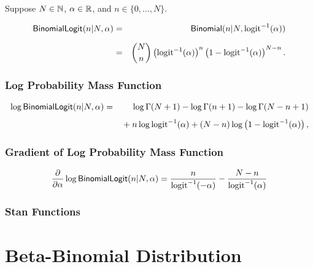 Suppose $N \in \mathbb{N}$, $\alpha \in \mathbb{R}$, and $n \in
\{0,\ldots,N\}$.

\begin{eqnarray*}
\mbox{\sf BinomialLogit}(n|N,\alpha)
& = & \mbox{\sf Binomial}(n|N,\mbox{logit}^{-1}(\alpha))
\\[6pt]
& = & \binom{N}{n} \left( \mbox{logit}^{-1}(\alpha) \right)^{n}
                    \left( 1 - \mbox{logit}^{-1}(\alpha) \right)^{N - n}.
\end{eqnarray*}


\subsubsection{Log Probability Mass Function}

\begin{eqnarray*}
\log \mbox{\sf BinomialLogit}(n|N,\alpha)
& = &
\log \Gamma(N+1) - \log \Gamma(n + 1) - \log \Gamma(N- n + 1)
\\[4pt]
& & { } + n \log \mbox{logit}^{-1}(\alpha) + (N - n) \log \left( 1 -
  \mbox{logit}^{-1}(\alpha) \right),
\end{eqnarray*}


\subsubsection{Gradient of Log Probability Mass Function}

\[
\frac{\partial}{\partial \alpha} \log \mbox{\sf BinomialLogit}(n|N,\alpha)
= \frac{n}{\mbox{logit}^{-1}(-\alpha)}
- \frac{N - n}{\mbox{logit}^{-1}(\alpha)}
\]


\subsubsection{Stan Functions}

\begin{description}
%
%
\end{description}



\section{Beta-Binomial Distribution}

